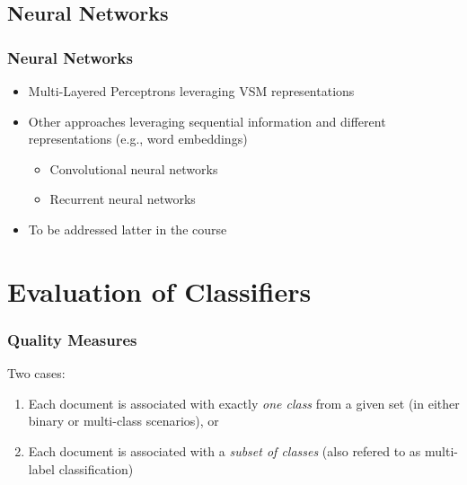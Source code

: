 \documentclass{beamer}
\begin{document}
\subsection{Neural Networks}

\begin{frame}
    \frametitle{Neural Networks}
    \begin{block}{}
    \begin{itemize}
    \item Multi-Layered Perceptrons leveraging VSM representations
    \item Other approaches leveraging sequential information and different representations (e.g., word embeddings)
    \begin{itemize}
    \item Convolutional neural networks
    \item Recurrent neural networks
    \end{itemize}
    \end{itemize}
    \end{block}
    \begin{itemize}
    \item To be addressed latter in the course
    \end{itemize}
\end{frame}


\section{Evaluation of Classifiers}

\begin{frame} \frametitle{Quality Measures}
  Two cases:
  \begin{enumerate}
  \item Each document is associated with exactly \emph{one class} from a given set (in either binary or multi-class scenarios), or
  \item Each document is associated with a \emph{subset of classes} (also refered to as multi-label classification)
  \end{enumerate}
\end{frame}

\end{document}
